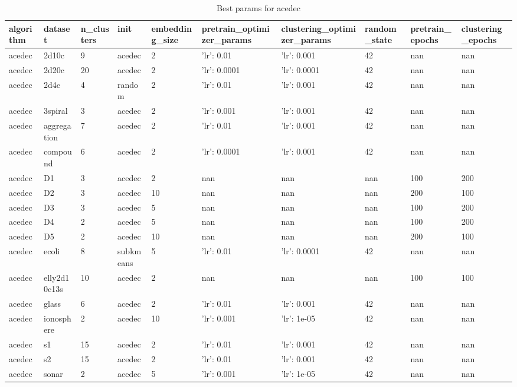 \begin{table}[H]
\centering
\caption{Best params for acedec}
\label{tab:params:acedec}
\begin{tabular}{|l|l|l|l|l|l|l|l|l|l|}
\hline
algorithm & dataset & n\_clusters & init & embedding\_size & pretrain\_optimizer\_params & clustering\_optimizer\_params & random\_state & pretrain\_epochs & clustering\_epochs \\
\hline
acedec & 2d10c & 9 & acedec & 2 & {'lr': 0.01} & {'lr': 0.001} & 42 & nan & nan \\
\hline
acedec & 2d20c & 20 & acedec & 2 & {'lr': 0.0001} & {'lr': 0.0001} & 42 & nan & nan \\
\hline
acedec & 2d4c & 4 & random & 2 & {'lr': 0.01} & {'lr': 0.001} & 42 & nan & nan \\
\hline
acedec & 3spiral & 3 & acedec & 2 & {'lr': 0.001} & {'lr': 0.001} & 42 & nan & nan \\
\hline
acedec & aggregation & 7 & acedec & 2 & {'lr': 0.01} & {'lr': 0.001} & 42 & nan & nan \\
\hline
acedec & compound & 6 & acedec & 2 & {'lr': 0.0001} & {'lr': 0.001} & 42 & nan & nan \\
\hline
acedec & D1 & 3 & acedec & 2 & nan & nan & nan & 100 & 200 \\
\hline
acedec & D2 & 3 & acedec & 10 & nan & nan & nan & 200 & 100 \\
\hline
acedec & D3 & 3 & acedec & 5 & nan & nan & nan & 100 & 200 \\
\hline
acedec & D4 & 2 & acedec & 5 & nan & nan & nan & 100 & 200 \\
\hline
acedec & D5 & 2 & acedec & 10 & nan & nan & nan & 200 & 100 \\
\hline
acedec & ecoli & 8 & subkmeans & 5 & {'lr': 0.01} & {'lr': 0.0001} & 42 & nan & nan \\
\hline
acedec & elly2d10c13s & 10 & acedec & 2 & nan & nan & nan & 100 & 100 \\
\hline
acedec & glass & 6 & acedec & 2 & {'lr': 0.01} & {'lr': 0.001} & 42 & nan & nan \\
\hline
acedec & ionosphere & 2 & acedec & 10 & {'lr': 0.001} & {'lr': 1e-05} & 42 & nan & nan \\
\hline
acedec & s1 & 15 & acedec & 2 & {'lr': 0.01} & {'lr': 0.001} & 42 & nan & nan \\
\hline
acedec & s2 & 15 & acedec & 2 & {'lr': 0.01} & {'lr': 0.001} & 42 & nan & nan \\
\hline
acedec & sonar & 2 & acedec & 5 & {'lr': 0.001} & {'lr': 1e-05} & 42 & nan & nan \\

\end{tabular}
\end{table}
